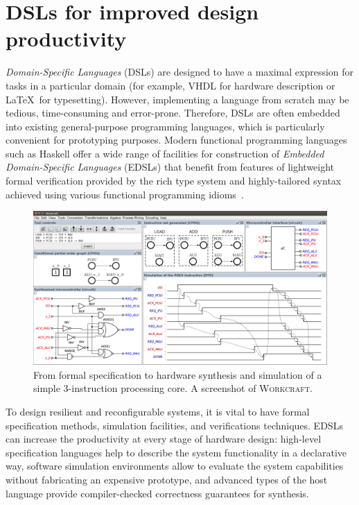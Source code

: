 \documentclass[conference]{IEEEtran}
\begin{document}
\section{DSLs for improved design productivity\label{sec:dsl}}

\emph{Domain-Specific Languages} (DSLs) are designed to have a maximal expression for
tasks in a particular domain (for example, VHDL for hardware description or
\LaTeX~for typesetting). However, implementing a language from scratch may be tedious,
time-consuming and error-prone. Therefore, DSLs are often embedded into existing general-purpose programming languages, which is particularly convenient for
prototyping purposes.
Modern functional programming languages such as Haskell offer a
wide range of facilities for construction of \emph{Embedded Domain-Specific Languages}
(EDSLs) that benefit from features of lightweight formal verification provided by
the rich type system and highly-tailored syntax achieved using various functional
programming idioms~\cite{HudakDSLs}.

\begin{figure}[ht!]
\begin{center}
    \includegraphics[width=0.95\linewidth]{FIG/screen.png}
    \vspace{-3mm}
    \caption{From formal specification to hardware synthesis and
    simulation of a simple 3-instruction processing core. A screenshot of \textsc{Workcraft}.}
    \label{fig:screenshot}
\end{center}
\vspace{-7mm}
\end{figure}

To design resilient and reconfigurable systems, it is vital to have formal
specification methods, simulation facilities, and verifications techniques.
EDSLs can increase the productivity at every stage of hardware design:
high-level specification
languages help to describe the system functionality in a declarative way, software
simulation environments allow to evaluate the system capabilities
without fabricating an expensive prototype, and advanced types of the host language
provide compiler-checked correctness guarantees for synthesis.
\end{document}
